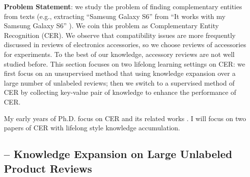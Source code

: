 \textbf{Problem Statement}: we study the problem of finding complementary entities from texts (e.g., extracting ``Samsung Galaxy S6'' from ``It works with my Samsung Galaxy S6'' ). We coin this problem as Complementary Entity Recognition (CER). We observe that compatibility issues are more frequently discussed in reviews of electronics accessories, so we choose reviews of accessories for experiments. To the best of our knowledge, accessory reviews are not well studied before.
This section focuses on two lifelong learning settings on CER: we first focus on an unsupervised method that using knowledge expansion over a large number of unlabeled reviews; then we switch to a supervised method of CER by collecting key-value pair of knowledge to enhance the performance of CER.

My early years of Ph.D. focus on CER and its related works \cite{xu2016CER,xu2016mining,xu2017supervised,xu2017product,xu2018dual}. I will focus on two papers of CER with lifelong style knowledge accumulation.

\subsection{-- Knowledge Expansion on Large Unlabeled Product Reviews}


